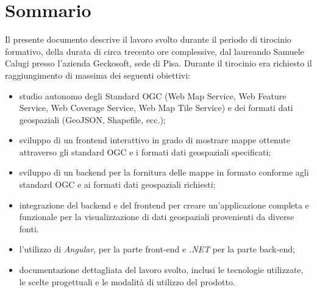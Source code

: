 \cleardoublepage{}
\begingroup
\let\clearpage\relax
\let\cleardoublepage\relax
\let\cleardoublepage\relax

\chapter*{Sommario}

Il presente documento descrive il lavoro svolto durante il periodo di tirocinio formativo, della durata di circa trecento ore complessive, dal laureando Samuele Calugi presso l'azienda Geckosoft, sede di Pisa.
Durante il tirocinio era richiesto il raggiungimento di massima dei seguenti obiettivi:
\begin{itemize}
    \item studio autonomo degli Standard OGC (Web Map Service, Web Feature Service, Web Coverage Service, Web Map Tile Service) e dei formati dati geospaziali (GeoJSON, Shapefile, ecc.);
    \item sviluppo di un frontend interattivo in grado di mostrare mappe ottenute attraverso gli standard OGC e i formati dati geospaziali specificati;
    \item sviluppo di un backend per la fornitura delle mappe in formato conforme agli standard OGC e ai formati dati geospaziali richiesti;
    \item integrazione del backend e del frontend per creare un'applicazione completa e funzionale per la visualizzazione di dati geospaziali provenienti da diverse fonti.
    \item l'utilizzo di \textit{Angular}, per la parte front-end e \textit{.NET} per la parte back-end;
    \item documentazione dettagliata del lavoro svolto, inclusi le tecnologie utilizzate, le scelte progettuali e le modalità di utilizzo del prodotto.
\end{itemize}

\endgroup

\vfill